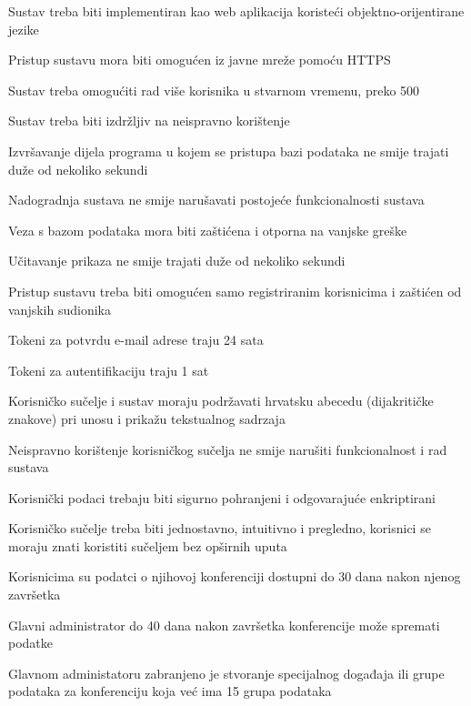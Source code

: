 		 
			\begin{packed_item}  
				 \item Sustav treba biti implementiran kao web aplikacija koristeći objektno-orijentirane jezike
				 \item Pristup sustavu mora biti omogućen iz javne mreže pomoću HTTPS
				 \item Sustav treba omogućiti rad više korisnika u stvarnom vremenu, preko 500
				 \item Sustav treba biti izdržljiv na neispravno korištenje
				 \item Izvršavanje dijela programa u kojem se pristupa bazi podataka ne smije trajati duže od nekoliko sekundi
				 \item Nadogradnja sustava ne smije narušavati postojeće funkcionalnosti sustava
				 \item Veza s bazom podataka mora biti zaštićena i otporna na vanjske greške
				 \item Učitavanje prikaza ne smije trajati duže od nekoliko sekundi
				 \item Pristup sustavu treba biti omogućen samo registriranim korisnicima i zaštićen od vanjskih sudionika
                \item Tokeni za potvrdu e-mail adrese traju 24 sata
                \item Tokeni za autentifikaciju traju 1 sat
                \item Korisničko sučelje i sustav moraju podržavati hrvatsku abecedu (dijakritičke znakove) pri unosu i prikažu tekstualnog sadrzaja
                \item Neispravno korištenje korisničkog sučelja ne smije narušiti funkcionalnost i rad sustava
                \item Korisnički podaci trebaju biti sigurno pohranjeni i odgovarajuće enkriptirani
                \item Korisničko sučelje treba biti jednostavno, intuitivno i pregledno, korisnici se moraju znati koristiti sučeljem bez opširnih uputa
                \item Korisnicima su podatci o njihovoj konferenciji dostupni do 30 dana nakon njenog završetka
                \item Glavni administrator do 40 dana nakon završetka konferencije može spremati podatke
                \item Glavnom administatoru zabranjeno je stvoranje specijalnog događaja ili grupe podataka za konferenciju koja već ima 15 grupa podataka

			\end{packed_item}
	